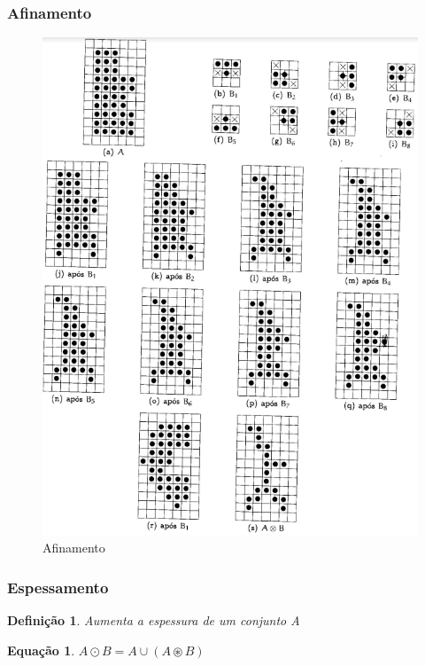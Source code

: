 \documentclass[aspectratio=169]{beamer}
\theoremstyle{Definition}
\newtheorem{defn}{Defini\c c\~ao}
\newtheorem{eq}[theorem]{Equa\c c\~ao}
\begin{document}
\begin{frame}
	\frametitle{Afinamento}
	
	\begin{figure}[h]
	 	\includegraphics[width=0.6\paperwidth,height=0.6\paperheight]{imagens/afinamento}
		\caption{Afinamento}\label{figLogical}
	\end{figure}
	
\end{frame}

\begin{frame}
	\frametitle{Espessamento}
	
	\begin{defn}
		Aumenta a espessura de um conjunto A
	\end{defn}
	
	\begin{eq}
			$ A \odot B = A \cup (A \circledast B) $
	\end{eq}
	
\end{frame}
\end{document}
